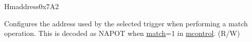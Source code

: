 \begin{register}{H}{maddress}{0x7A2}\label{regdesc:MADDRESS}
%
\regnewline%
\begin{regdesc}\begin{reglist}
\label{fielddesc:MADDRESS}\item [maddress] Configures the address used by the selected trigger when performing a match operation. This is decoded as NAPOT when \hyperref[fielddesc:MCONTROLMATCH]{match}=1 in \hyperref[regdesc:MCONTROL]{mcontrol}. (R/W)
\end{reglist}\end{regdesc}
\end{register}

